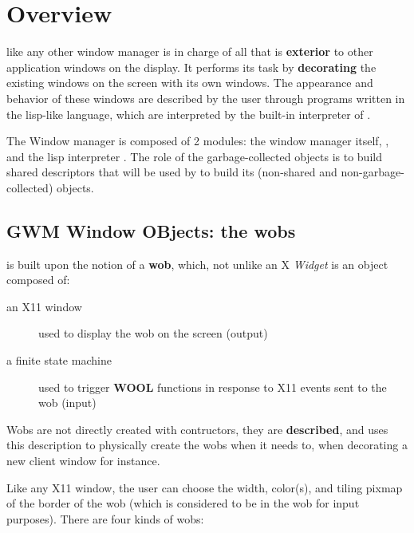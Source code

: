 \chapter{Overview}

\sloppy

{\GWM} like any other window manager is in charge of all that is {\bf
exterior} to other application windows on the display. It performs its task
by {\bf decorating} the existing windows on the screen with its own windows.
The appearance and behavior of these windows are described by the user through
programs written in the lisp-like {\WOOL} language, which are interpreted by
the built-in {\WOOL} interpreter of {\GWM}.

The {\GWM} Window manager is composed of 2 modules: the window manager itself,
{\GWM}, and the lisp interpreter {\WOOL}. The role of the garbage-collected
{\WOOL} objects is to build shared descriptors that will be used by {\GWM}
to build its (non-shared and non-garbage-collected) objects.

\section{GWM Window OBjects: the wobs}

{\GWM} is built upon the notion of a {\bf wob}, which, not unlike an X {\sl
Widget} is an object composed of:

\begin{description} 

\item[an X11 window] used to display the wob on the screen (output)

\item[a {\WOOL} finite state machine] used to trigger {\bf WOOL}
functions in response to X11 events sent to the wob (input)

\end{description}

Wobs are not directly created with {\WOOL} contructors, they are {\bf
described}, and {\GWM} uses this description to physically create the
wobs when it needs to, when decorating a new client window for instance.

Like any X11 window, the user can choose the width, color(s), and tiling
pixmap of the border of the wob (which is considered to be in the wob for
input purposes). There are four kinds of wobs:

